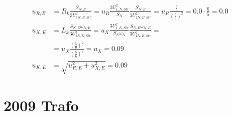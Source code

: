 \documentclass[11pt,a4paper]{scrartcl}
\newcommand{\mybr}[1]{\left(#1\right)}
\newcommand{\0}{_{\mybr{0}}}
\newcommand{\1}{_{\mybr{1}}}
\newcommand{\2}{_{\mybr{2}}}
\newcommand{\UPNS}{U_{1,N,Str}}
\begin{document}
\section{}
\begin{align}
u_{R,E}&=R_k\frac{S_{N,E}}{3U_{1N,E,Str}^2}=u_R\frac{3\UPNS^2}{S_N}\frac{S_{N,E}}{3U_{1N,E,Str}^2}=u_R\frac{\frac{5}{6}}{\mybr{\frac{5}{6}}^2}=\num{0.0}\cdot\frac{6}{5}=\num{0.0}\\
u_{X,E}&=L_k\frac{S_{N,E}\omega_{N,E}}{3U_{1N,E,Str}^2}=u_X\frac{3\UPNS^2}{S_N\omega_N}\frac{S_{N,E}\omega_{N,E}}{3U_{1N,E,Str}^2}=\\
&=u_X\frac{\mybr{\frac{5}{6}}^2}{\mybr{\frac{5}{6}}^2}=u_X=\num{0.09}\\
u_{K,E}&=\sqrt{u_{R,E}^2+u_{X,E}^2}=0.09
\end{align}

\clearpage
\part{2009 Trafo}
\end{document}
